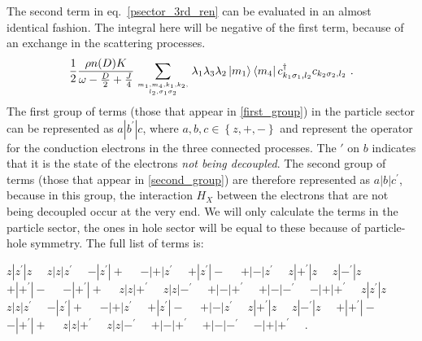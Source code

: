 \documentclass[10pt]{iopart}
\begin{document}
The second term in eq.~\ref{psector_3rd_ren} can be evaluated in an almost identical fashion. The integral here will be negative of the first term, because of an exchange in the scattering processes.
\begin{eqnarray}
	\label{second_group}
	\frac{1}{2}\frac{\rho n(D) K}{\omega - \frac{D}{2} + \frac{J}{4}}\sum_{m_1,m_4,k_1,k_2,\atop{l_2,\sigma_1\sigma_2}}\lambda_{1}\lambda_{3}\lambda_{2}\ket{m_1}\bra{m_4}c^\dagger_{k_1 \sigma_1, l_2}c_{k_2 \sigma_2,l_2}~.
\end{eqnarray}
The first group of terms (those that appear in \ref{first_group}) in the particle sector can be represented as \(a|b^\prime|c\), where \(a,b,c \in \left\{z,+,-\right\} \) and represent the operator for the conduction electrons in the three connected processes. The \(\prime\) on \(b\) indicates that it is the state of the electrons \textit{not being decoupled}. The second group of terms (those that appear in \ref{second_group}) are therefore represented as \(a|b|c^\prime\), because in this group, the interaction \(H_X\) between the electrons that are not being decoupled occur at the very end.
We will only calculate the terms in the particle sector, the ones in hole sector will be equal to these because of particle-hole symmetry. The full list of terms is: 


$z|z^\prime|z\quad$
$z|z|z^\prime\quad$
$-|z^\prime|+\quad$
$-|+|z^\prime\quad$
$+|z^\prime|-\quad$
$+|-|z^\prime\quad$
$ z|+^\prime|z\quad$
$z|-^\prime|z\quad$
$+|+^\prime|-\quad$
$-|+^\prime|+\quad$
$z|z|+^\prime\quad$
$z|z|-^\prime\quad$
$ +|-|+^\prime\quad$
$+|-|-^\prime\quad$
$-|+|+^\prime\quad$
$z|z^\prime|z\quad$
$z|z|z^\prime\quad$
$-|z^\prime|+\quad$
$ -|+|z^\prime\quad$
$+|z^\prime|-\quad$
$+|-|z^\prime\quad$
$z|+^\prime|z\quad$
$z|-^\prime|z\quad$
$+|+^\prime|-\quad$
$-|+^\prime|+\quad$
$z|z|+^\prime\quad$
$z|z|-^\prime\quad$
$+|-|+^\prime\quad$
$+|-|-^\prime\quad$
$-|+|+^\prime\quad$
.
\end{document}

